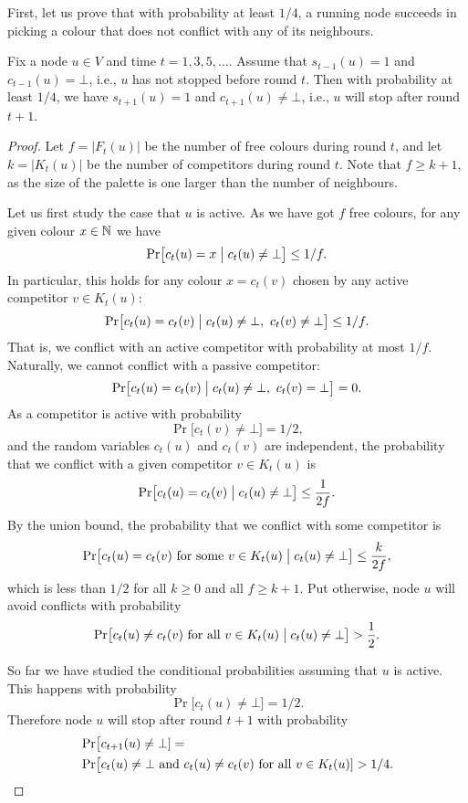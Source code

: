 First, let us prove that with probability at least $1/4$, a running node succeeds in picking a colour that does not conflict with any of its neighbours.
\begin{lemma}\label{lem:bdrand-onestep}
    Fix a node $u \in V$ and time $t = 1,3,5,\dotsc$. Assume that $s_{t-1}(u) = 1$ and $c_{t-1}(u) = \bot$, i.e., $u$ has not stopped before round $t$. Then with probability at least $1/4$, we have $s_{t+1}(u) = 1$ and $c_{t+1}(u) \ne \bot$, i.e., $u$ will stop after round $t+1$.
\end{lemma}
\begin{proof}
    Let $f = |F_t(u)|$ be the number of free colours during round $t$, and let $k = |K_t(u)|$ be the number of competitors during round $t$. Note that $f \ge k + 1$, as the size of the palette is one larger than the number of neighbours.

    Let us first study the case that $u$ is active. As we have got $f$ free colours, for any given colour $x \in \mathbb{N}$ we have
    \[
        \Pr\bigl[ c_t(u) = x \bigm| c_t(u) \ne \bot \bigr] \le 1/f.
    \]
    In particular, this holds for any colour $x = c_t(v)$ chosen by any active competitor $v \in K_t(u)$:
    \[
        \Pr\bigl[ c_t(u) = c_t(v) \bigm| c_t(u) \ne \bot,\  c_t(v) \ne \bot \bigr] \le 1/f.
    \]
    That is, we conflict with an active competitor with probability at most $1/f$. Naturally, we cannot conflict with a passive competitor:
    \[
        \Pr\bigl[ c_t(u) = c_t(v) \bigm| c_t(u) \ne \bot,\  c_t(v) = \bot \bigr] = 0.
    \]
    As a competitor is active with probability
    \[
        \Pr\bigl[ c_t(v) \ne \bot \bigr] = 1/2,
    \]
    and the random variables $c_t(u)$ and $c_t(v)$ are independent, the probability that we conflict with a given competitor $v \in K_t(u)$ is
    \[
        \Pr\bigl[ c_t(u) = c_t(v) \bigm| c_t(u) \ne \bot \bigr] \le \frac{1}{2f}.
    \]
    By the union bound, the probability that we conflict with some competitor is
    \[
        \Pr\bigl[ c_t(u) = c_t(v) \text{ for some $v \in K_t(u)$} \bigm| c_t(u) \ne \bot \bigr] \le \frac{k}{2f},
    \]
    which is less than $1/2$ for all $k \ge 0$ and all $f \ge k+1$. Put otherwise, node $u$ will avoid conflicts with probability
    \[
        \Pr\bigl[ c_t(u) \ne c_t(v) \text{ for all $v \in K_t(u)$} \bigm| c_t(u) \ne \bot \bigr] > \frac{1}{2}.
    \]

    So far we have studied the conditional probabilities assuming that $u$ is active. This happens with probability
    \[
        \Pr\bigl[ c_t(u) \ne \bot \bigr] = 1/2.
    \]
    Therefore node $u$ will stop after round $t+1$ with probability
    \[
    \begin{split}
        &\Pr\bigl[ c_{t+1}(u) \ne \bot] = \\
        &\Pr\bigl[ c_t(u) \ne \bot \text { and } c_t(u) \ne c_t(v) \text{ for all $v \in K_t(u)$} ] > 1/4.
        \qedhere
    \end{split}
    \]
\end{proof}

